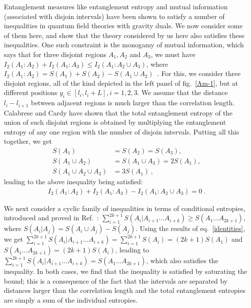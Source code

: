 Entanglement measures like entanglement entropy and mutual information (associated with disjoin intervals) have been shown to satisfy a number of inequalities in quantum field theories with gravity duals. We now consider some of them here, and show that the theory considered by us here also satisfies these inequalities. One such constraint is the monogamy of mutual information, which says that for three disjoint regions \(A_1, A_2\) and \(A_3\), we must have \(I_2(A_1:A_2) + I_2(A_1:A_3) \leq I_2(A_1:A_2\cup A_3)\), where \(I_2(A_1:A_2) = S(A_1) + S(A_2) - S(A_1\cup A_2)\)~\cite{haydenEntanglement2013}. For this, we consider three disjoint regions, all of the kind depicted in the left panel of fig.~\ref{Am-1}, but at different positions \(y_i \in \left[l_i, l_i + L\right],i=1,2,3\). We assume that the distance \(l_i - l_{i+1}\) between adjacent regions is much larger than the correlation length. Calabrese and Cardy have shown that the total entanglement entropy of the union of such disjoint regions is obtained by multiplying the entanglement entropy of any one region with the number of disjoin intervals. Putting all this together, we get
\begin{equation}\begin{aligned}\label{identities}
	S(A_1) &= S(A_2) = S(A_3),\\
	S(A_1 \cup A_2) &= S(A_1 \cup A_3) = 2S(A_1),\\
	S(A_1 \cup A_2 \cup A_3) &= 3S(A_1)~,
\end{aligned}\end{equation}
leading to the above inequality being satisfied:
\begin{equation}\begin{aligned}
	I_2(A_1:A_2) + I_2(A_1:A_3) - I_2(A_1:A_2\cup A_3) = 0~.
\end{aligned}\end{equation}

We next consider a cyclic family of inequalities in terms of conditional entropies, introduced and proved in Ref.~\cite{Bao2015}: \(\sum_{i=1}^{2k+1} S(A_i|A_{i+1}\ldots A_{i+k}) \geq S(A_1\ldots A_{2k+1})\), where \(S(A_i|A_j) = S(A_i\cup A_j) - S(A_j)\). Using the results of eq.~\eqref{identities}, we get \(\sum_{i=1}^{2k+1}S(A_i|A_{i+1}\ldots A_{i+k}) = \sum_{i=1}^{2k+1}S(A_i) = (2k+1)S(A_1)\) and \(S(A_1\ldots A_{2k+1}) = (2k+1)S(A_i)\), leading to \(\sum_{i=1}^{2k+1} S(A_i|A_{i+1}\ldots A_{i+k}) = S(A_1\ldots A_{2k+1})\), which also satisfies the inequality. In both cases, we find that the inequality is satisfied by saturating the bound; this is a consequence of the fact that the intervals are separated by distances larger than the correlation length and the total entanglement entropies are simply a sum of the individual entropies.


